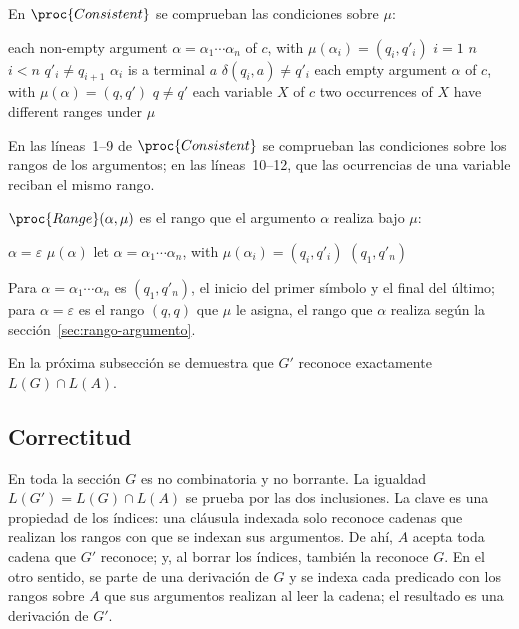 En $\proc{Consistent}$ se comprueban las condiciones sobre $\mu$:

\begin{codebox}
\li \For each non-empty argument $\alpha = \alpha_1 \cdots \alpha_n$ of $c$, with $\mu(\alpha_i) = (q_i, q'_i)$
\li \Do
        \For $i = 1$ \To $n$
\li     \Do
            \If $i < n$  $q'_i \neq q_{i+1}$
\li         \Then \Return {}
            \End
\li         \If $\alpha_i$ is a terminal $a$  $\delta(q_i, a) \neq q'_i$
\li         \Then \Return {}
            \End
        \End
    \End
\li \For each empty argument $\alpha$ of $c$, with $\mu(\alpha) = (q, q')$
\li \Do
        \If $q \neq q'$
\li     \Then \Return {}
        \End
    \End
\li \For each variable $X$ of $c$
\li \Do
        \If two occurrences of $X$ have different ranges under $\mu$
\li     \Then \Return {}
        \End
    \End
\li \Return {}
\end{codebox}

En las líneas~1--9 de $\proc{Consistent}$ se comprueban las condiciones
sobre los rangos de los argumentos; en las líneas~10--12, que las
ocurrencias de una variable reciban el mismo rango.

$\proc{Range}(\alpha, \mu)$ es el rango que el argumento $\alpha$
realiza bajo $\mu$:

\begin{codebox}
\li \If $\alpha = \varepsilon$
\li \Then \Return $\mu(\alpha)$
    \End
\li let $\alpha = \alpha_1 \cdots \alpha_n$, with $\mu(\alpha_i) = (q_i, q'_i)$
\li \Return $(q_1, q'_n)$
\end{codebox}

Para $\alpha = \alpha_1 \cdots \alpha_n$ es $(q_1, q'_n)$, el inicio del
primer símbolo y el final del último; para $\alpha = \varepsilon$ es el
rango $(q, q)$ que $\mu$ le asigna, el rango que $\alpha$ realiza según
la sección~\ref{sec:rango-argumento}.

En la próxima subsección se demuestra que $G'$ reconoce
exactamente $L(G) \cap L(A)$.

\subsection{Correctitud}

En toda la sección $G$ es no combinatoria y no borrante. La igualdad
$L(G') = L(G) \cap L(A)$ se prueba por las dos inclusiones.
La clave es una propiedad de los índices: una cláusula indexada solo
reconoce cadenas que realizan los rangos con que se indexan sus
argumentos. De ahí, $A$ acepta toda cadena que $G'$ reconoce; y, al
borrar los índices, también la reconoce $G$. En el otro sentido, se
parte de una derivación de $G$ y se indexa cada predicado con los rangos
sobre $A$ que sus argumentos realizan al leer la cadena; el resultado es
una derivación de $G'$.

